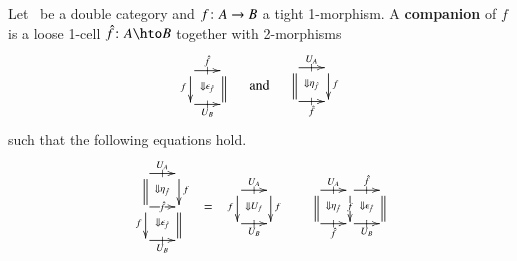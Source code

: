 \begin{defn}\label{def:companion}
  Let \lD\ be a double category and $f\colon A\to B$ a tight
  1-morphism.  A \textbf{companion} of $f$ is a loose 1-cell
  $\fhat\maps A\hto B$ together with 2-morphisms
  \begin{equation*}
    \begin{array}{c}
      \xymatrix@-.5pc{
        \ar[r]|-@{|}^-{\fhat} \ar[d]_f \ar@{}[dr]|{\Downarrow \epsilon_{\hat{f}} }
        & \ar@{=}[d]\\
        \ar[r]|-@{|}_-{U_B} & }
    \end{array}\quad\text{and}\quad
    \begin{array}{c}
      \xymatrix@-.5pc{
        \ar[r]|-@{|}^-{U_A} \ar@{=}[d] \ar@{}[dr]|{\Downarrow \eta_{\hat{f}}}
        & \ar[d]^f\\
        \ar[r]|-@{|}_-{\fhat} & }
    \end{array}
  \end{equation*}
  such that the following equations hold.
  \begin{align}\label{eq:compeqn}
    \begin{array}{c}
      \xymatrix@-.5pc{
        \ar[r]|-@{|}^-{U_A} \ar@{=}[d] \ar@{}[dr]|{\Downarrow \eta_{\hat{f}}}
        & \ar[d]^f\\
        \ar[r]|-{\fhat} \ar[d]_f \ar@{}[dr]|
        {\Downarrow  \epsilon_{\hat{f}} }
        & \ar@{=}[d]\\
        \ar[r]|-@{|}_-{U_B} & }
    \end{array} &= 
    \begin{array}{c}
      \xymatrix@-.5pc{ \ar[r]|-@{|}^-{U_A} \ar[d]_f
        \ar@{}[dr]|{\Downarrow U_f} &  \ar[d]^f\\
        \ar[r]|-@{|}_-{U_B} & }
    \end{array}
    &
    \begin{array}{c}
      \xymatrix@-.5pc{
        \ar[r]|-@{|}^-{U_A} \ar@{=}[d] \ar@{}[dr]|{ \Downarrow \eta_{\hat{f}}}&
        \ar[r]|-@{|}^{\fhat}\ar[d]|f \ar@{}[dr]|{\Downarrow  \epsilon_{\hat{f}} }
        & \ar@{=}[d]\\
        \ar[r]|-@{|}_-{\fhat} &
        \ar[r]|-@{|}_-{U_B} &}

\end{array}
\end{align}
\end{defn}
